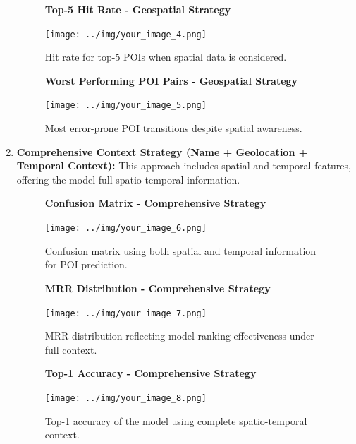 \documentclass[12pt,a4paper]{article}
\begin{document}
\begin{enumerate}
\begin{figure}[H]
\centering
\textbf{Top-5 Hit Rate - Geospatial Strategy}\par
\vspace{0.5em}
\texttt{[image: ../img/your\_image\_4.png]}
\caption{Hit rate for top-5 POIs when spatial data is considered.}
\label{fig:geospatial_top5}
\end{figure}

\begin{figure}[H]
\centering
\textbf{Worst Performing POI Pairs - Geospatial Strategy}\par
\vspace{0.5em}
\texttt{[image: ../img/your\_image\_5.png]}
\caption{Most error-prone POI transitions despite spatial awareness.}
\label{fig:geospatial_worst_pairs}
\end{figure}

\item \textbf{Comprehensive Context Strategy (Name + Geolocation + Temporal Context):} This approach includes spatial and temporal features, offering the model full spatio-temporal information.

\begin{figure}[H]
\centering
\textbf{Confusion Matrix - Comprehensive Strategy}\par
\vspace{0.5em}
\texttt{[image: ../img/your\_image\_6.png]}
\caption{Confusion matrix using both spatial and temporal information for POI prediction.}
\label{fig:comprehensive_confusion}
\end{figure}

\begin{figure}[H]
\centering
\textbf{MRR Distribution - Comprehensive Strategy}\par
\vspace{0.5em}
\texttt{[image: ../img/your\_image\_7.png]}
\caption{MRR distribution reflecting model ranking effectiveness under full context.}
\label{fig:comprehensive_mrr}
\end{figure}

\begin{figure}[H]
\centering
\textbf{Top-1 Accuracy - Comprehensive Strategy}\par
\vspace{0.5em}
\texttt{[image: ../img/your\_image\_8.png]}
\caption{Top-1 accuracy of the model using complete spatio-temporal context.}
\label{fig:comprehensive_top1}
\end{figure}


\end{enumerate}
\end{document}
